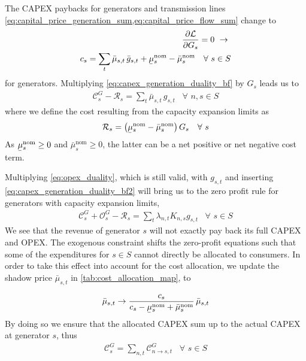 \documentclass[11pt,twocolumn]{article}
\newcommand{\ubar}[1]{\underaccent{\bar}{#1}}
\newcommand{\Forall}[1]{\hspace{10pt} \forall \,\, #1 }
\newcommand{\pdv}[2]{\frac{\partial #1}{\partial #2}}
\newcommand{\generation}{g_{s,t}}
\newcommand{\generationpotential}{\bar{g}_{s,t}}
\newcommand{\capacitygeneration}{G_{s}}
\newcommand{\capitalpricegeneration}{c_{s}}
\newcommand{\muuppergeneration}{\bar{\mu}_{s,t}}
\newcommand{\muuppergenerationnom}{\bar{\mu}^\text{nom}_{s}}
\newcommand{\mulowergenerationnom}{\ubar{\mu}^\text{nom}_{s}}
\newcommand{\lagrangian}{\mathcal{L}}
\newcommand{\lmp}[1][n]{\lambda_{#1,t}}
\newcommand{\incidencegenerator}[1][n]{K_{#1,s}}
\newcommand{\opexgeneration}{\mathcal{O}^G}
\newcommand{\capexgeneration}{\mathcal{C}^G}
\newcommand{\remainingcost}{\mathcal{R}}
\newcommand{\allocatecapexgeneration}[1][n \rightarrow s]{\capexgeneration_{#1,t}}
\begin{document}
The CAPEX paybacks for generators and transmission lines
\cref{eq:capital_price_generation_sum,eq:capital_price_flow_sum} change to 
\begin{align}
\pdv{\lagrangian}{\capacitygeneration}  = 0 \,\, \rightarrow \,\, \\
\capitalpricegeneration =  \sum_t \muuppergeneration \, \generationpotential + \mulowergenerationnom - \muuppergenerationnom \Forall{s \in S}
\label{eq:capex_generation_duality_bf}
\end{align}
for generators. Multiplying \cref{eq:capex_generation_duality_bf} by $ \capacitygeneration$ leads us to 
\begin{align}
 \capexgeneration_s - \remainingcost_s=  \sum_t \muuppergeneration \, \generation \Forall{n,s \in S}
 \label{eq:capex_generation_duality_bf2}
\end{align}
where we define the cost resulting from the capacity expansion limits as
\begin{align}
    \remainingcost_s = \left(\mulowergenerationnom - \muuppergenerationnom \right) \capacitygeneration
    \Forall{s}
\end{align}
As $\mulowergenerationnom \ge 0$ and $\muuppergenerationnom \ge 0$, the latter can be a net positive or net negative cost term.

Multiplying \cref{eq:opex_duality}, which is still valid, with $\generation$ and inserting \cref{eq:capex_generation_duality_bf2} will bring us to the zero profit rule for generators with capacity expansion limits, 
\begin{align}
    \capexgeneration_s + \opexgeneration_s  - \remainingcost_s = \sum_t \lmp \incidencegenerator \generation \Forall{s \in S}
\end{align}
We see that the revenue of generator $s$ will not exactly pay back its full CAPEX and OPEX. The exogenous constraint shifts the zero-profit equations such that some of the expenditures for $s \in S$ cannot directly be allocated to consumers. In order to take this effect into account for the cost allocation, we update the shadow price $\muuppergeneration$ in \cref{tab:cost_allocation_map}, to 

\begin{align}
    \muuppergeneration \rightarrow \dfrac{\capitalpricegeneration}{\capitalpricegeneration - \mulowergenerationnom + \muuppergenerationnom}\, \muuppergeneration
\end{align}
By doing so we ensure that the allocated CAPEX sum up to the actual CAPEX at generator $s$, thus 
\begin{align}
    \capexgeneration_s = \sum_{n,t} \allocatecapexgeneration \Forall{s \in S}
\end{align}
\end{document}

